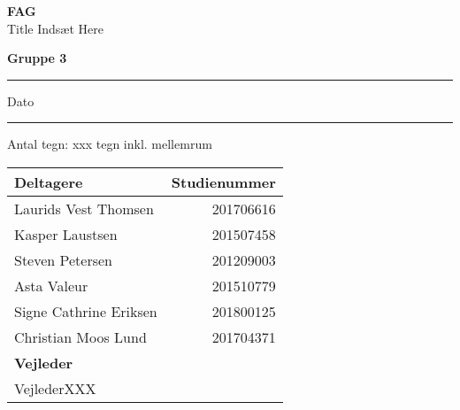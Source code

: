 \begin{titlepage}
       \Huge
       \textbf{FAG}\\
       Title Indsæt Here
       
        \Large
       \vspace{0.5cm}
        \textbf{Gruppe 3}
        \plainbreak{0.5}
        Dato
        \plainbreak{0.5}
        Antal tegn: xxx tegn inkl. mellemrum
        \vspace{4.1cm}
      

\begin{center}


 
 
       \vspace{0.5cm}
        \normalsize
        \begin{tabular}{lr}
           \begin{minipage}[t]{7CM} \textbf{Deltagere} \vspace{1mm}\end{minipage}  &  \textbf{Studienummer}\\
            \toprule
            Laurids Vest Thomsen    &  201706616\\
            Kasper Laustsen         &  201507458\\
            Steven Petersen         &  201209003\\
            Asta Valeur             &  201510779\\
            Signe Cathrine Eriksen  &  201800125\\
            Christian Moos Lund     &  201704371\\
            \bottomrule
            \begin{minipage}[t]{7CM} \vspace{2mm} \textbf{Vejleder} \vspace{1mm}\end{minipage}  &  \textbf{}\\
            \toprule
            VejlederXXX           & \\
            \bottomrule
        \end{tabular}
 \end{center}
       \vfill

    
       \vspace{0.8cm}
\thispagestyle{empty}
\end{titlepage}
\newpage
